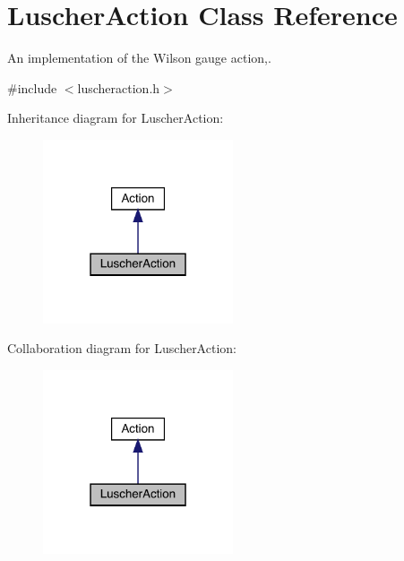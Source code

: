 \hypertarget{class_luscher_action}{}\section{Luscher\+Action Class Reference}
\label{class_luscher_action}


An implementation of the Wilson gauge action,.  




{\ttfamily \#include $<$luscheraction.\+h$>$}



Inheritance diagram for Luscher\+Action\+:\nopagebreak
\begin{figure}[H]
\begin{center}
\leavevmode
\includegraphics[width=159pt]{class_luscher_action__inherit__graph}
\end{center}
\end{figure}


Collaboration diagram for Luscher\+Action\+:\nopagebreak
\begin{figure}[H]
\begin{center}
\leavevmode
\includegraphics[width=159pt]{class_luscher_action__coll__graph}
\end{center}
\end{figure}
